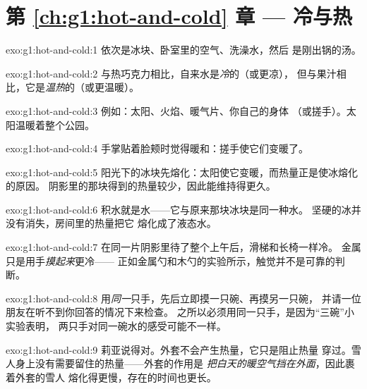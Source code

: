 \section*{第 \ref{ch:g1:hot-and-cold} 章 --- 冷与热}

\begin{solution}{exo:g1:hot-and-cold:1}
依次是冰块、卧室里的空气、洗澡水，然后
是刚出锅的汤。
\end{solution}

\begin{solution}{exo:g1:hot-and-cold:2}
与热巧克力相比，自来水是\emph{冷}的（或更凉），
但与果汁相比，它是\emph{温热}的（或更温暖）。
\end{solution}

\begin{solution}{exo:g1:hot-and-cold:3}
例如：太阳、火焰、暖气片、你自己的身体
（或搓手）。太阳温暖着整个公园。
\end{solution}

\begin{solution}{exo:g1:hot-and-cold:4}
手掌贴着脸颊时觉得暖和：搓手使它们变暖了。
\end{solution}

\begin{solution}{exo:g1:hot-and-cold:5}
阳光下的冰块先熔化：太阳使它变暖，而热量正是使冰熔化的原因。
阴影里的那块得到的热量较少，因此能维持得更久。
\end{solution}

\begin{solution}{exo:g1:hot-and-cold:6}
积水就是水——它与原来那块冰块是同一种水。
坚硬的冰并没有消失，房间里的热量把它
熔化成了液态水。
\end{solution}

\begin{solution}{exo:g1:hot-and-cold:7}
在同一片阴影里待了整个上午后，滑梯和长椅一样冷。
金属只是用手\emph{摸起来}更冷——
正如金属勺和木勺的实验所示，触觉并不是可靠的判断。
\end{solution}

\begin{solution}{exo:g1:hot-and-cold:8}
用\emph{同一}只手，先后立即摸一只碗、再摸另一只碗，
并请一位朋友在听不到你回答的情况下来检查。
之所以必须用同一只手，是因为“三碗”小实验表明，
两只手对同一碗水的感受可能不一样。
\end{solution}

\begin{solution}{exo:g1:hot-and-cold:9}
莉亚说得对。外套不会产生热量，它只是阻止热量
穿过。雪人身上没有需要留住的热量——外套的作用是
\emph{把白天的暖空气挡在外面}，因此裹着外套的雪人
熔化得更慢，存在的时间也更长。
\end{solution}
